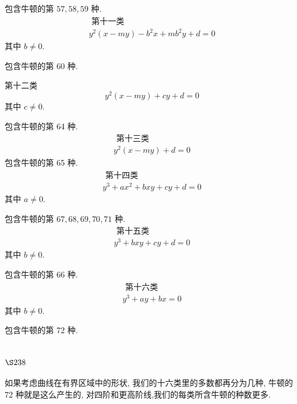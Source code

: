 包含牛顿的第 $57,58,59$ 种.
\[
\begin{gathered}
\text { 第十一类 } \\
y^{2}(x-m y)-b^{2} x+m b^{2} y+d=0
\end{gathered}
\]
其中 $b \neq 0$.

包含牛顿的第 60 种.

第十二类
\[
y^{2}(x-m y)+c y+d=0
\]
其中 $c \neq 0$.

包含牛顿的第 64 种.
\[
\begin{gathered}
\text { 第十三类 } \\
y^{2}(x-m y)+d=0
\end{gathered}
\]
包含牛顿的第 65 种.
\[
\begin{gathered}
\text { 第十四类 } \\
y^{3}+a x^{2}+b x y+c y+d=0
\end{gathered}
\]
其中 $a \neq 0$.

包含牛顿的第 $67,68,69,70,71$ 种.
\[
\begin{gathered}
\text { 第十五类 } \\
y^{3}+b x y+c y+d=0
\end{gathered}
\]
其中 $b \neq 0$.

包含牛顿的第 66 种.
\[
\begin{gathered}
\text { 第十六类 } \\
y^{3}+a y+b x=0
\end{gathered}
\]
其中 $b \neq 0$.

包含牛顿的第 72 种.

\section{$\S 238$}

如果考虑曲线在有界区域中的形状, 我们的十六类里的多数都再分为几种, 牛顿的 72 种就是这么产生的, 对四阶和更高阶线,我们的每类所含牛顿的种数更多. 

